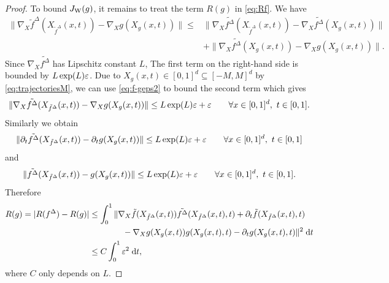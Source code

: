 \begin{proof}
  To bound $J_{\rm W}(g)$, it remains to treat the term
  $R(g)$ in \eqref{eq:Rf}. We have
  \begin{align*}
    \|\nabla_X \tilde f^\Delta(X_{\tilde f^\Delta}(x,t))-\nabla_Xg(X_g(x,t))\|
    \le
    &\|\nabla_X\tilde {f^\Delta}(X_{\tilde f^\Delta}(x,t))-\nabla_X\tilde {f^\Delta}(X_g(x,t))\|\nonumber\\
    &+\|\nabla_X\tilde {f^\Delta}(X_g(x,t))-\nabla_Xg(X_g(x,t))\|.
  \end{align*}
  Since $\nabla_X\tilde {f^\Delta}$ has Lipschitz constant $L$,
  The first term on the right-hand side is bounded by $L\exp(L)\varepsilon$.
  Due to $X_g(x,t)\in [0,1]^d\subseteq [-M,M]^d$ by \eqref{eq:trajectoriesM},
  we can use \eqref{eq:f-geps2} to bound the second term which gives
  \begin{equation*}
    \|\nabla_X\tilde {f^\Delta}(X_{\tilde f^\Delta}(x,t))-\nabla_Xg(X_g(x,t))\|
    \le L\exp(L)\varepsilon+\varepsilon
    \qquad\forall x\in[0,1]^d,~t\in [0,1].
  \end{equation*}
  Similarly we obtain
  \begin{equation*}
    \|\partial_t \tilde { f^\Delta}(X_{\tilde f^\Delta}(x,t))-\partial_t g(X_g(x,t))\|
    \le L\exp(L)\varepsilon+\varepsilon
    \qquad\forall x\in[0,1]^d,~t\in [0,1]
  \end{equation*}
  and
  \begin{equation*}
    \|\tilde {f^\Delta}(X_{\tilde f^\Delta}(x,t))-g(X_g(x,t))\|
    \le L\exp(L)\varepsilon+\varepsilon \qquad\forall x\in[0,1]^d,~t\in [0,1].
  \end{equation*}
  Therefore
  \begin{align*}
    R(g)=|R({f^\Delta})-R(g)|
    &\le \int_0^1\|\nabla_X \tilde f(X_{\tilde f^\Delta}(x,t)) \tilde {f^\Delta}(X_{\tilde f^\Delta}(x,t),t)+\partial_t \tilde f(X_{\tilde f^\Delta}(x,t),t) \\
    &\qquad\qquad-\nabla_X g(X_g(x,t)) g(X_g(x,t),t)-\partial_t g(X_g(x,t),t)\|^2\;\mathrm{d} t\\
    &\le C \int_0^1 \varepsilon^2\;\mathrm{d} t,
  \end{align*}
  where $C$ only depends on $L$.
\end{proof}














  

